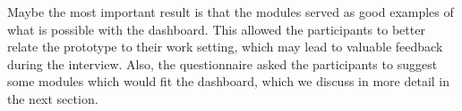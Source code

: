     Maybe the most important result is that the modules served as good examples of what is possible with the dashboard. This allowed the participants to better relate the prototype to their work setting, which may lead to valuable feedback during the interview. Also, the questionnaire asked the participants to suggest some modules which would fit the dashboard, which we discuss in more detail in the next section.

    \begin{table}[!t]
\end{table}
